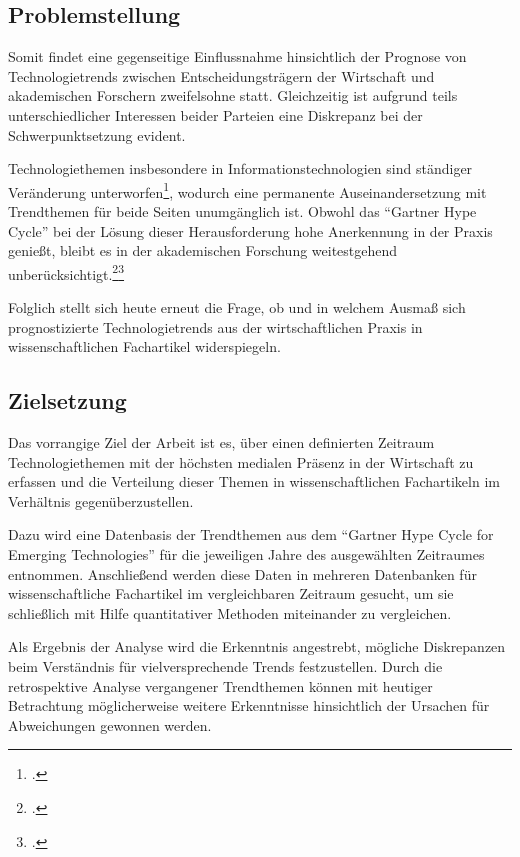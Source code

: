 \subsection{Problemstellung}
Somit findet eine gegenseitige Einflussnahme hinsichtlich der Prognose von Technologietrends zwischen Entscheidungsträgern der Wirtschaft und akademischen Forschern zweifelsohne statt. Gleichzeitig ist aufgrund teils unterschiedlicher Interessen beider Parteien eine Diskrepanz bei der Schwerpunktsetzung evident. 

Technologiethemen insbesondere in Informationstechnologien sind ständiger Veränderung unterworfen\footcite[Vgl.][S.~107f]{Chang2009}, wodurch eine permanente Auseinandersetzung mit Trendthemen für beide Seiten unumgänglich ist. Obwohl das "`Gartner Hype Cycle"' bei der Lösung dieser Herausforderung hohe Anerkennung in der Praxis genießt, bleibt es in der akademischen Forschung weitestgehend unberücksichtigt.\footcite[Vgl.][S.~241]{OLeary2008}\footcite[Vgl.][S.~12]{Jarvenpaa2008}

Folglich stellt sich heute erneut die Frage, ob und in welchem Ausmaß sich prognostizierte Technologietrends aus der wirtschaftlichen Praxis in wissenschaftlichen Fachartikel widerspiegeln.

\subsection{Zielsetzung}
Das vorrangige Ziel der Arbeit ist es, über einen definierten Zeitraum Technologiethemen mit der höchsten medialen Präsenz in der Wirtschaft zu erfassen und die Verteilung dieser Themen in wissenschaftlichen Fachartikeln im Verhältnis gegenüberzustellen.

Dazu wird eine Datenbasis der Trendthemen aus dem "`Gartner Hype Cycle for Emerging Technologies"' für die jeweiligen Jahre des ausgewählten Zeitraumes entnommen. Anschließend werden diese Daten in mehreren Datenbanken für wissenschaftliche Fachartikel im vergleichbaren Zeitraum gesucht, um sie schließlich mit Hilfe quantitativer Methoden miteinander zu vergleichen.

Als Ergebnis der Analyse wird die Erkenntnis angestrebt, mögliche Diskrepanzen beim Verständnis für vielversprechende Trends festzustellen. Durch die retrospektive Analyse vergangener Trendthemen können mit heutiger Betrachtung möglicherweise weitere Erkenntnisse hinsichtlich der Ursachen für Abweichungen gewonnen werden.


